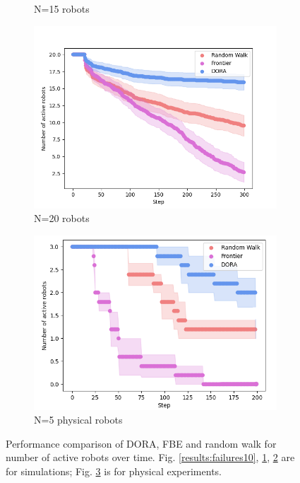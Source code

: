 \begin{figure}
\begin{subfigure}{0.45\textwidth}
        \caption{N=15 robots}
        \label{results:failures15}
    \end{subfigure}
    \begin{subfigure}{0.45\textwidth}
        \includegraphics[width=\textwidth]{figures/dora_explorer/activerobots_20.png}
        \caption{N=20 robots}
        \label{results:failures20}
    \end{subfigure}
    \begin{subfigure}{0.45\textwidth}
        \includegraphics[width=\textwidth]{figures/dora_explorer/activerobots_real.png}
        \caption{N=5 physical robots}
        \label{results:active_robots_physical}
    \end{subfigure}
    \caption[DORA survival performance]{Performance comparison of \ac{DORA}, \ac{FBE} and random walk for number of active robots over time. Fig. \ref{results:failures10}, \ref{results:failures15}, \ref{results:failures20} are for simulations; Fig. \ref{results:active_robots_physical} is for physical experiments.} 
    \label{results:dora_active}
\end{figure}

